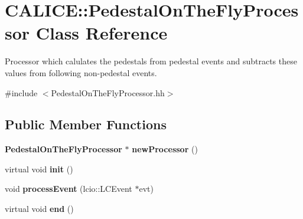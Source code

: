 \section{CALICE::PedestalOnTheFlyProcessor Class Reference}
\label{classCALICE_1_1PedestalOnTheFlyProcessor}


Processor which calulates the pedestals from pedestal events and subtracts these values from following non-\/pedestal events.  


{\ttfamily \#include $<$PedestalOnTheFlyProcessor.hh$>$}\subsection*{Public Member Functions}
\begin{DoxyCompactItemize}
\item 
{\bf PedestalOnTheFlyProcessor} $\ast$ {\bfseries newProcessor} ()\label{classCALICE_1_1PedestalOnTheFlyProcessor_a10c562d70b7a3a6822d1d787680a1e2c}

\item 
virtual void {\bfseries init} ()\label{classCALICE_1_1PedestalOnTheFlyProcessor_a39648da7746870ad75bafa83eab06a09}

\item 
void {\bfseries processEvent} (lcio::LCEvent $\ast$evt)\label{classCALICE_1_1PedestalOnTheFlyProcessor_ab4d4773fe6ce8137a8e6e8f3b10c97c5}

\item 
virtual void {\bfseries end} ()\label{classCALICE_1_1PedestalOnTheFlyProcessor_a4150cde3c7b10d8f43bf28f676efefad}

\end{DoxyCompactItemize}
